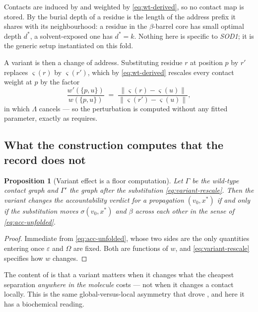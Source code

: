 \documentclass[11pt,twocolumn,a4paper]{article}
\theoremstyle{thmstyle}
\newtheorem{proposition}[theorem]{Proposition}
\theoremstyle{definition}
\theoremstyle{remark}
\newcommand{\Gph}{\Gamma}
\newcommand{\wt}{w}
\newcommand{\flo}{\beta}
\newcommand{\str}{\sigma}
\newcommand{\sse}{\varsigma}
\newcommand{\norm}[1]{\lVert#1\rVert}
\newcommand{\eps}{\varepsilon}
\begin{document}
Contacts are induced by  and weighted by
\eqref{eq:wt-derived}, so no contact map is stored. By
 the burial depth of a residue is the length of
the address prefix it shares with its neighbourhood: a residue in the
$\beta$-barrel core has small optimal depth $d^{*}$, a
solvent-exposed one has $d^{*} = k$. Nothing here is specific to
\emph{SOD1}; it is the generic setup instantiated on this fold.

A variant is then a change of address. Substituting residue $r$ at
position $p$ by $r'$ replaces $\sse(r)$ by $\sse(r')$, which by
\eqref{eq:wt-derived} rescales every contact weight at $p$ by the
factor
\begin{equation}
  \frac{\wt'(\{p,u\})}{\wt(\{p,u\})}
  \;=\;
  \frac{\norm{\sse(r) - \sse(u)}}{\norm{\sse(r') - \sse(u)}} ,
  \label{eq:variant-rescale}
\end{equation}
in which $\Lambda$ cancels --- so the perturbation is computed without
any fitted parameter, exactly as  requires.

\subsection{What the construction computes that the record does not}

\begin{proposition}[Variant effect is a floor computation]
\label{prop:variant-floor}
Let $\Gph$ be the wild-type contact graph and $\Gph'$ the graph after
the substitution \eqref{eq:variant-rescale}. Then the variant changes
the accountability verdict for a propagation $(v_0,x^{*})$ if and only
if the substitution moves $\str(v_0,x^{*})$ and $\flo$ across each
other in the sense of \eqref{eq:acc-unfolded}.
\end{proposition}

\begin{proof}
Immediate from \eqref{eq:acc-unfolded}, whose two sides are the only
quantities entering  once $\eps$ and $\Omega$ are
fixed. Both are functions of $\wt$, and \eqref{eq:variant-rescale}
specifies how $\wt$ changes.
\end{proof}

The content of  is that a variant matters when
it changes what the cheapest separation \emph{anywhere in the molecule}
costs --- not when it changes a contact locally. This is the same
global-versus-local asymmetry that drove ,
and here it has a biochemical reading.
\end{document}
